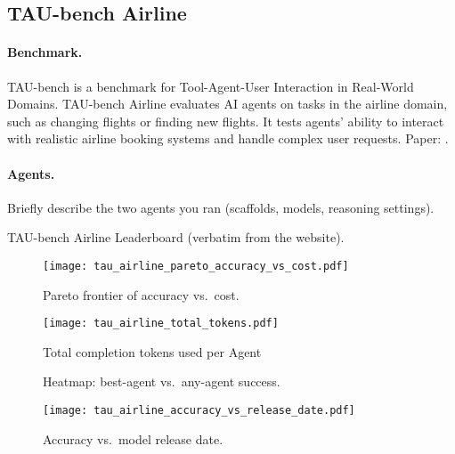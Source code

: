 \subsection{TAU-bench Airline}\label{app:taubench_airline}

\paragraph{Benchmark.}
TAU-bench is a benchmark for Tool-Agent-User Interaction in Real-World Domains. TAU-bench Airline evaluates AI agents on tasks in the airline domain, such as changing flights or finding new flights. It tests agents' ability to interact with realistic airline booking systems and handle complex user requests.
Paper: \cite{taubench}.

\paragraph{Agents.}
Briefly describe the two agents you ran (scaffolds, models, reasoning settings).


\begin{table}[t]
  \centering
  \caption{TAU-bench Airline Leaderboard (verbatim from the website).}
  \label{tab:taubench_airline_full}
  
\end{table}


\begin{figure}[htbp]
  \centering
  \texttt{[image: tau\_airline\_pareto\_accuracy\_vs\_cost.pdf]}
  \caption{Pareto frontier of accuracy vs.\ cost.}
  \label{fig:tau_airline_pareto}
\end{figure}

\begin{figure}[htbp]
  \centering
  \texttt{[image: tau\_airline\_total\_tokens.pdf]}
  \caption{Total completion tokens used per Agent}
  \label{fig:tau_airline_tokens}
\end{figure}

\begin{figure*}[t]
  \centering
  \caption{Heatmap: best-agent vs.\ any-agent success.}
  \label{fig:tau_airline_heatmap}
\end{figure*}

\begin{figure}[htbp]
  \centering
  \texttt{[image: tau\_airline\_accuracy\_vs\_release\_date.pdf]}
  \caption{Accuracy vs.\ model release date.}
  \label{fig:tau_airline_release}
\end{figure}

\clearpage